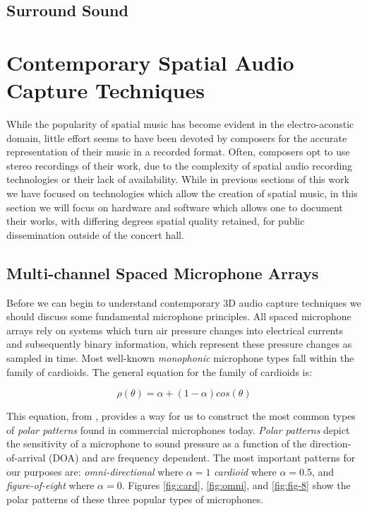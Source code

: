 \subsection{Surround Sound}

\section{Contemporary Spatial Audio Capture Techniques} \label{sec:contemp_audio_capture}

While the popularity of spatial music has become evident in the electro-acoustic domain, little effort seems to have been devoted by composers for the accurate representation of their music in a recorded format. Often, composers opt to use stereo recordings of their work, due to the complexity of spatial audio recording technologies or their lack of availability. While in previous sections of this work we have focused on technologies which allow the creation of spatial music, in this section we will focus on hardware and software which allows one to document their works, with differing degrees spatial quality retained, for public dissemination outside of the concert hall. 

\subsection{Multi-channel Spaced Microphone Arrays}

Before we can begin to understand contemporary 3D audio capture techniques we should discuss some fundamental microphone principles. All spaced microphone arrays rely on systems which turn air pressure changes into electrical currents and subsequently binary information, which represent these pressure changes as sampled in time. Most well-known \textit{monophonic} microphone types fall within the family of cardioids. The general equation for the family of cardioids is:

\begin{equation}
    \rho(\theta) = \alpha + (1-\alpha)cos(\theta)
\end{equation}

This equation, from \cite{ortolani2015introduction}, provides a way for us to construct the most common types of \textit{polar patterns} found in commercial microphones today. \textit{Polar patterns} depict the sensitivity of a microphone to sound pressure as a function of the direction-of-arrival (DOA) and are frequency dependent. The most important patterns for our purposes are: \textit{omni-directional} where $\alpha=1$ \textit{cardioid} where $\alpha = 0.5$, and \textit{figure-of-eight} where $\alpha=0$. Figures \ref{fig:card}, \ref{fig:omni}, and \ref{fig:fig-8} show the polar patterns of these three popular types of microphones. 

